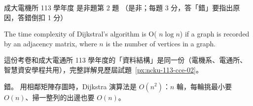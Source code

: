\begin{pastexam}[label={px:ncku-113-ee-02}]{成大電機所 113 學年度 是非題第 2 題}
（是非；每題 3 分，答「錯」要指出原因，答錯倒扣 1 分）

The time complexity of Dijkstral's algorithm is O( $n\log n$) if a graph is recorded by an
adjacency matrix, where $n$ is the number of vertices in a graph.
\end{pastexam}

\begin{pastsoln}
這份考卷和成大電通所 113 學年度的「資料結構」是同一份（電機系、電通所、智慧資安學程共用），完整詳解見歷屆試題~\ref{px:ncku-113-cce-02}。

錯。 用相鄰矩陣存圖時，Dijkstra 演算法是 $O(n^2)$：$n$ 輪，每輪挑最小要 $O(n)$、掃一整列的出邊也要 $O(n)$。
\end{pastsoln}
